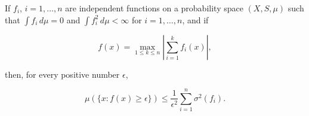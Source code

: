 If $f_i$, $i = 1, \dots, n$ are independent functions on a probability space $(X, S, \mu)$ such that $\int f_i \, d\mu = 0$ and $\int f_i^2 \, d\mu < \infty$ for $i = 1, \dots, n$, and if

$$f(x) = \max_{1 \leq k \leq n} \left| \sum_{i=1}^{k} f_i(x) \right|,$$

then, for every positive number $\epsilon$,

$$\mu(\{x : f(x) \geq \epsilon\}) \leq \frac{1}{\epsilon^2} \sum_{i=1}^{n} \sigma^2(f_i).$$

